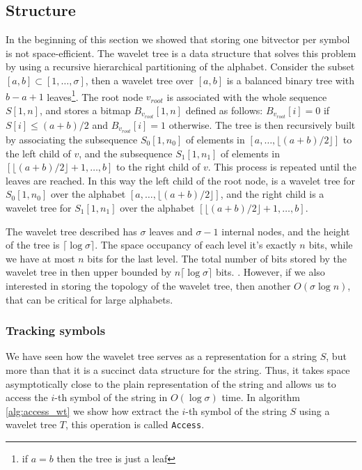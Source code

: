 \subsection{Structure}

In the beginning of this section we showed that storing one bitvector per symbol is not space-efficient. The wavelet tree is a data structure that solves this problem by using a recursive hierarchical partitioning of the alphabet. Consider the subset $[a,b] \subset [1, \dots, \sigma]$, then a wavelet tree over $[a,b]$ is a balanced binary tree with $b-a+1$ leaves\footnote{if $a=b$ then the tree is just a leaf}. The root node $v_{root}$ is associated with the whole sequence $S[1,n]$, and stores a bitmap $B_{v_{root}}[1,n]$ defined as follows: $B_{v_{root}}[i] = 0$ if $S[i] \leq (a+b)/2$ and $B_{v_{root}}[i] = 1$ otherwise. The tree is then recursively built by associating the subsequence $S_0[1,n_0]$ of elements in $[a, \dots,\lfloor (a+b)/2 \rfloor ]$ to the left child of $v$, and the subsequence $S_1[1,n_1]$ of elements in $[\lfloor (a+b)/2 \rfloor +1,\dots, b]$ to the right child of $v$. This process is repeated until the leaves are reached. In this way the left child of the root node, is a wavelet tree for $S_0[1,n_0]$ over the alphabet $[a,\dots, \lfloor (a+b)/2 \rfloor ]$, and the right child is a wavelet tree for $S_1[1,n_1]$ over the alphabet $[\lfloor (a+b)/2 \rfloor +1,\dots, b]$. \cite{WTForALL}

\begin{example}

\end{example}

\begin{remark} \label{rem:space_occupancy_wavelet_tree}
    The wavelet tree described has $\sigma$ leaves and $\sigma-1$ internal nodes, and the height of the tree is $ \lceil \log \sigma \rceil$. The space occupancy of each level it's exactly $n$ bits, while we have at most $n$ bits for the last level. The total number of bits stored by the wavelet tree in then upper bounded by $n \lceil \log \sigma \rceil$ bits. \cite{WTForALL}. However, if we also interested in storing the topology of the wavelet tree, then another $O(\sigma \log n)$, that can be critical for large alphabets. \cite{WTForALL}
\end{remark}

\subsubsection*{Tracking symbols}
We have seen how the wavelet tree serves as a representation for a string $S$, but more than that it is a succinct data structure for the string. Thus, it takes space asymptotically close to the plain representation of the string and allows us to access the $i$-th symbol of the string in $O(\log \sigma)$ time. In algorithm \ref{alg:access_wt} we show how extract the $i$-th symbol of the string $S$ using a wavelet tree $T$, this operation is called \texttt{Access}. \vspace{0.4cm}

